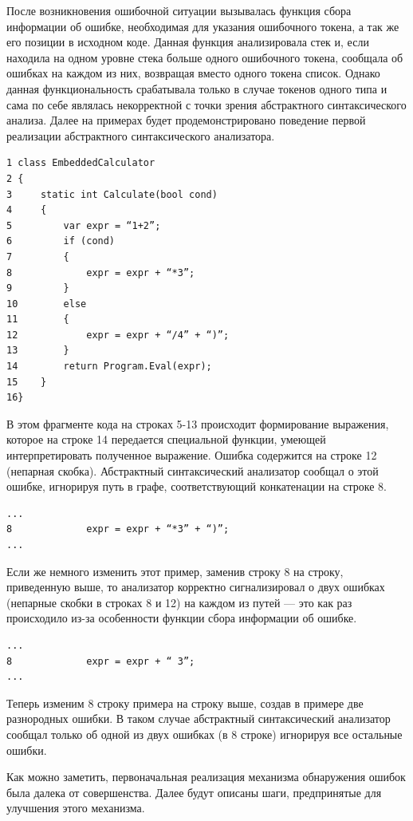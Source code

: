 После возникновения ошибочной ситуации вызывалась функция сбора информации об 
ошибке, необходимая для указания ошибочного токена, а так же его позиции в исходном 
коде. Данная функция анализировала стек и, если находила на одном уровне стека 
больше одного ошибочного токена, сообщала об ошибках на каждом из них, возвращая 
вместо одного токена список. Однако данная функциональность срабатывала только в 
случае токенов одного типа и сама по себе являлась некорректной с точки зрения 
абстрактного синтаксического анализа. Далее на примерах будет продемонстрировано 
поведение первой реализации абстрактного синтаксического анализатора.

\begin{verbatim}
1 class EmbeddedCalculator 
2 {
3     static int Calculate(bool cond)
4     {
5         var expr = “1+2”;
6         if (cond)
7         {
8             expr = expr + “*3”; 
9         }
10        else
11        {
12            expr = expr + “/4” + “)”;
13        }
14        return Program.Eval(expr);
15    }
16}
\end{verbatim}

В этом фрагменте кода на строках 5-13 происходит формирование выражения, которое  
на строке 14 передается специальной функции, умеющей интерпретировать полученное 
выражение. Ошибка содержится на строке 12 (непарная скобка). Абстрактный синтаксический 
анализатор сообщал о этой ошибке, игнорируя путь в графе, соответствующий конкатенации 
на строке 8.

\begin{verbatim}
...
8             expr = expr + “*3” + “)”; 
...
\end{verbatim}

Если же немного изменить этот пример, заменив строку 8 на строку, приведенную выше, 
то анализатор корректно сигнализировал о двух ошибках (непарные скобки в строках 
8 и 12) на каждом из путей — это как раз происходило из-за особенности функции 
сбора информации об ошибке.

\begin{verbatim}
...
8             expr = expr + “ 3”;
...
\end{verbatim}
Теперь изменим 8 строку примера на строку выше, создав в примере две разнородных 
ошибки. В таком случае абстрактный синтаксический анализатор сообщал только об 
одной из двух ошибках (в 8 строке) игнорируя все остальные ошибки.

Как можно заметить, первоначальная реализация механизма обнаружения ошибок была 
далека от совершенства. Далее будут описаны шаги, предпринятые для улучшения этого 
механизма. 

